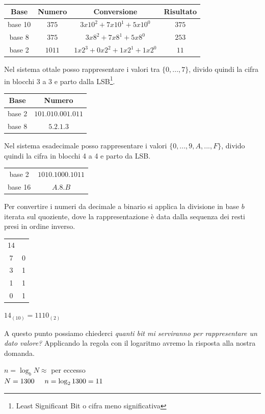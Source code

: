 \begin{center}
    \begin{tabular}{ c | c c c}
        Base & Numero & Conversione & Risultato\\\hline
        base 10 & $375$ & $3x10^2+7x10^1+5x10^0$ & $375$\\\hline
        base 8 & $375$ & $3x8^2+7x8^1+5x8^0$ & $253$\\\hline
        base 2 & $1011$ & $1x2^3+0x2^2+1x2^1+1x2^0$ & $11$
    \end{tabular}
    
    Nel sistema ottale posso rappresentare i valori tra $\{0,...,7\}$, divido quindi la cifra in blocchi 3 a 3 e parto dalla LSB\footnote{Least Significant Bit o cifra meno significativa}.
    
    \begin{tabular}{ c | c }
        Base & Numero\\\hline
        base 2 & $101.010.001.011$\\
        base 8 & $5.2.1.3$
    \end{tabular}
    
    Nel sistema esadecimale posso rappresentare i valori $\{0,...,9, A,...,F\}$, divido quindi la cifra in blocchi 4 a 4 e parto da LSB.
    
    \begin{tabular}{ c | c }
        \hline
        base 2 & $1010.1000.1011$\\
        base 16 & $A.8.B$
    \end{tabular}
\end{center}
Per convertire i numeri da decimale a binario si applica la divisione in base $b$ iterata sul quoziente, dove la rappresentazione è data dalla sequenza dei resti presi in ordine inverso.
\begin{center}
    \begin{tabular}{ c | c }
            14 & \\
            7 & 0\\
            3 & 1\\
            1 & 1\\
            0 & 1\\
    \end{tabular}
    $14_{(10)}=1110_{(2)}$    
\end{center}
A questo punto possiamo chiederci \textit{quanti bit mi serviranno per rappresentare un dato valore?}
Applicando la regola con il logaritmo avremo la risposta alla nostra domanda.
\begin{center}$n = \log_b{N} \approx$ per eccesso\\$N = 1300\hspace{0,5cm}n = \log_2{1300} = 11$\end{center}

